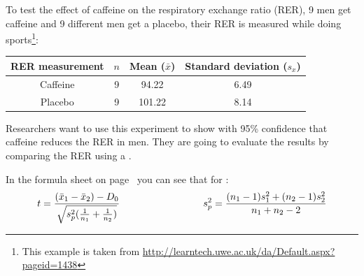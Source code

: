 \setcounter{chapter}{5}
\setcounter{section}{3}
\setcounter{question}{0}



To test the effect of caffeine on the respiratory exchange ratio (RER), 9 men get caffeine and 9 different men get a placebo, their RER is measured while doing sports\footnote{This example is taken from \url{http://learntech.uwe.ac.uk/da/Default.aspx?pageid=1438}}: \\
\vspace*{0.5cm}
\begin{center}
\begin{tabular}{c|ccc}
RER measurement & $n$ & Mean ($\bar{x}$) & Standard deviation ($s_x$) \tstrut\bstrut\\
\hline
Caffeine & 9 & 94.22 & 6.49 \tstrut\bstrut\\
Placebo & 9 & 101.22 & 8.14 \tstrut\bstrut\\
\end{tabular}
\end{center}
\vspace*{0.5cm}

Researchers want to use this experiment to show with 95\% confidence that caffeine reduces the RER in men. They are going to evaluate the results by comparing the  RER using a . \\


\twolineanswerbox


\hypothesesbox

In the formula sheet on page~\pageref{formulasheet} you can see that for :
\vspace*{0.5cm}
\begin{equation*}
    t = \frac{(\bar{x}_1 - \bar{x}_2) - D_0}{\sqrt{s^2_p (\frac{1}{n_1} + \frac{1}{n_2})}}
    \hspace*{3cm}
    s^2_p = \frac{(n_1 - 1) s^2_1 + (n_2 - 1) s^2_2}{n_1 + n_2 - 2}
\end{equation*}
\vspace*{0.5cm}

